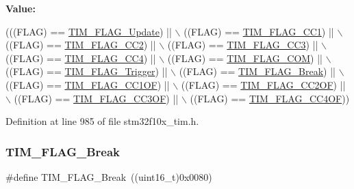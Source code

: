 {\bfseries Value\+:}
\begin{DoxyCode}
(((FLAG) == \hyperlink{group___t_i_m___flags_ga97eba66f792c88e08131bd0d2a0e530d}{TIM\_FLAG\_Update}) || \(\backslash\)
                               ((FLAG) == \hyperlink{group___t_i_m___flags_gaa7eb8be054b9bd217a9abb1c8687cc55}{TIM\_FLAG\_CC1}) || \(\backslash\)
                               ((FLAG) == \hyperlink{group___t_i_m___flags_ga9cae242f1c51b31839ffc5bc007c82a7}{TIM\_FLAG\_CC2}) || \(\backslash\)
                               ((FLAG) == \hyperlink{group___t_i_m___flags_ga052c380f922219659810e4fceb574a7c}{TIM\_FLAG\_CC3}) || \(\backslash\)
                               ((FLAG) == \hyperlink{group___t_i_m___flags_gafd0dc57b56941f8b8250d66e289542db}{TIM\_FLAG\_CC4}) || \(\backslash\)
                               ((FLAG) == \hyperlink{group___t_i_m___flags_gad454d70205ce5bbf3b3c0e7e43d6df62}{TIM\_FLAG\_COM}) || \(\backslash\)
                               ((FLAG) == \hyperlink{group___t_i_m___flags_gaeca2f17eea738dbec7eee8ecbe442814}{TIM\_FLAG\_Trigger}) || \(\backslash\)
                               ((FLAG) == \hyperlink{group___t_i_m___flags_ga166571a1d5ca2bfca5d923eaa22f6deb}{TIM\_FLAG\_Break}) || \(\backslash\)
                               ((FLAG) == \hyperlink{group___t_i_m___flags_ga38dfb7d1ed00af77d70bc3be28500108}{TIM\_FLAG\_CC1OF}) || \(\backslash\)
                               ((FLAG) == \hyperlink{group___t_i_m___flags_ga4df0c71d3e695c214d49802942e04590}{TIM\_FLAG\_CC2OF}) || \(\backslash\)
                               ((FLAG) == \hyperlink{group___t_i_m___flags_gac81f24eaffdf83c2db9d2e6078a00919}{TIM\_FLAG\_CC3OF}) || \(\backslash\)
                               ((FLAG) == \hyperlink{group___t_i_m___flags_gafc8b04654766d98ba2c6fed601895a20}{TIM\_FLAG\_CC4OF}))
\end{DoxyCode}


Definition at line 985 of file stm32f10x\+\_\+tim.\+h.

\mbox{\label{group___t_i_m___flags_ga166571a1d5ca2bfca5d923eaa22f6deb}} 
\subsubsection{\texorpdfstring{T\+I\+M\+\_\+\+F\+L\+A\+G\+\_\+\+Break}{TIM\_FLAG\_Break}}
{\footnotesize\ttfamily \#define T\+I\+M\+\_\+\+F\+L\+A\+G\+\_\+\+Break~((uint16\+\_\+t)0x0080)}



